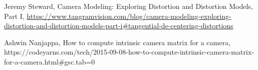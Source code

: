 \documentclass[11pt]{scrartcl}
\begin{document}
\begin{thebibliography}{9}
Jeremy Steward, Camera Modeling: Exploring Distortion and Distortion Models, Part I, \url{https://www.tangramvision.com/blog/camera-modeling-exploring-distortion-and-distortion-models-part-i#tangential-de-centering-distortions}

Ashwin Nanjappa, How to compute intrinsic camera matrix for a camera, \\
https://codeyarns.com/tech/2015-09-08-how-to-compute-intrinsic-camera-matrix-for-a-camera.html#gsc.tab=0




 
\end{thebibliography}
\end{document}
